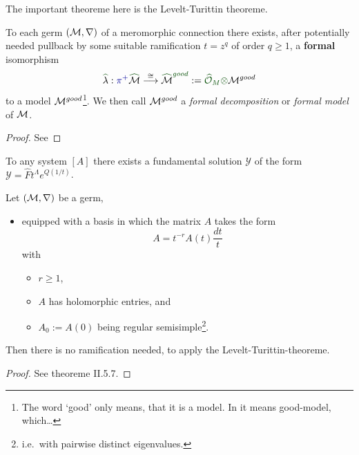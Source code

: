 The important theoreme here is the Levelt-Turittin theoreme.
\begin{thm}
  To each germ $(\mathcal{M},\nabla)$ of a meromorphic connection there exists, after
  potentially needed \textcolor{blue!60!black}{pullback by some suitable
  ramification $t=z^q$ of order $q\geq1$}, a
  \textcolor{green!30!black}{\textbf{formal}} isomorphism
  \[
    \textcolor{green!30!black}{\hat{\textcolor{black}{\lambda}}}:
    \textcolor{blue!60!black}{\pi^{+}}
    \textcolor{green!30!black}{\hat{\textcolor{black}{\cM}}}
    \overset{\cong}\longrightarrow
    \textcolor{green!30!black}{\hat{\textcolor{black}{\cM}}^{good}}
    :=\textcolor{green!30!black}{\hat\cO_M\otimes}\cM^{good}
  \]
  to a model $\mathcal{M}^{good}$\footnote{The word `good' only means, that it is a
  model. In \cite{sabbah2007isomonodromic} it means good-model,
  which\dots\TODO}.
  We then call $\mathcal{M}^{good}$ a \emph{formal decomposition} or \emph{formal
  model} of $\mathcal{M}$.
\end{thm}
\begin{proof}
  See \TODO
\end{proof}
\begin{cor}
  To any system $[A]$ there exists a fundamental solution $\mathcal{Y}$ of the
  form $\mathcal{Y}=\hat F t^\Lambda e^{Q(1/t)}$.
\end{cor}

\begin{prop}
  Let $(\mathcal{M},\nabla)$ be a germ,
  \begin{itemize}
    \item equipped with a basis in which the matrix $A$ takes the form
      \[
        A=t^{-r}A(t)\frac{dt}{t}
      \]
      with
      \begin{itemize}
        \item $r\geq1$,
        \item $A$ has holomorphic entries, and
        \item $A_0:=A(0)$ being regular semisimple\footnote{i.e.\ with
          pairwise distinct eigenvalues.}.
      \end{itemize}
  \end{itemize}
  Then there is no ramification needed, to apply the Levelt-Turittin-theoreme.
  \begin{comment}
    Further, all the summands $\cR_\phi$ have rank one, which is not the case
    in general.
  \end{comment}
\end{prop}
\begin{proof}
  See \cite{sabbah2007isomonodromic} theoreme II.5.7.
\end{proof}

